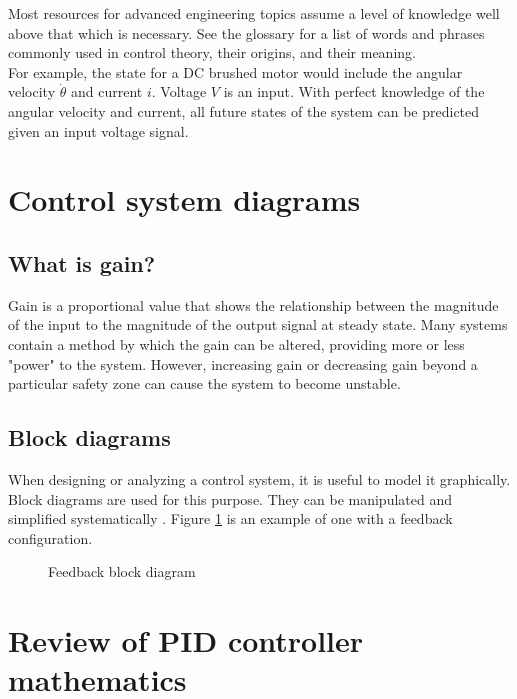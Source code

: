 \documentclass[10pt,conference,compsoc]{IEEEtran}
\begin{document}
\noindent Most resources for advanced engineering topics assume a level of
knowledge well above that which is necessary. See the glossary for a list of
words and phrases commonly used in control theory, their origins, and their
meaning. \\

\noindent For example, the \gls{state} for a DC brushed motor would include the
angular velocity $\dot{\theta}$ and current $i$. Voltage $V$ is an input. With
perfect knowledge of the angular velocity and current, all future \glspl{state}
of the \gls{system} can be predicted given an input voltage signal. \\

\section{Control system diagrams}

\subsection{What is gain?}

\noindent Gain is a proportional value that shows the relationship between the
magnitude of the input to the magnitude of the output signal at steady state.
Many \glspl{system} contain a method by which the gain can be altered, providing
more or less "power" to the \gls{system}. However, increasing gain or decreasing
gain beyond a particular safety zone can cause the \gls{system} to become
unstable.

\subsection{Block diagrams}

\noindent When designing or analyzing a control system, it is useful to model it
graphically. Block diagrams are used for this purpose. They can be manipulated
and simplified systematically \cite{bib:block_diagrams}. Figure
\ref{fig:feedback_loop} is an example of one with a feedback configuration.

\begin{figure}[H]
  \centering
  \def\svgwidth{0.5\columnwidth}
  
  \caption{Feedback block diagram}
  \label{fig:feedback_loop}
\end{figure}

\section{Review of PID controller mathematics}
\end{document}
